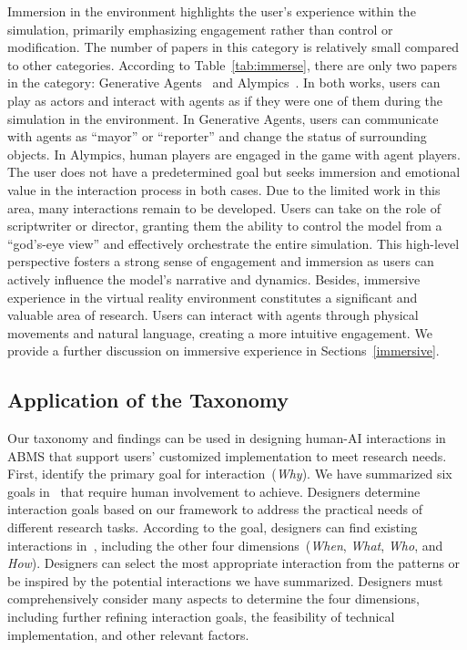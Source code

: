 Immersion in the environment highlights the user’s experience within the simulation, primarily emphasizing engagement rather than control or modification.
The number of papers in this category is relatively small compared to other categories.
According to Table~\ref{tab:immerse}, there are only two papers in the category: Generative Agents~\cite{10.1145/3586183.3606763} and Alympics~\cite{mao2024alympicsllmagentsmeet}.
In both works, users can play as actors and interact with agents as if they were one of them during the simulation in the environment.
In Generative Agents, users can communicate with agents as ``mayor'' or ``reporter'' and change the status of surrounding objects.
In Alympics, human players are engaged in the game with agent players.
The user does not have a predetermined goal but seeks immersion and emotional value in the interaction process in both cases.
Due to the limited work in this area, many interactions remain to be developed.
Users can take on the role of scriptwriter or director,  granting them the ability to control the model from a ``god’s-eye view'' and effectively orchestrate the entire simulation.
This high-level perspective fosters a strong sense of engagement and immersion as users can actively influence the model's narrative and dynamics.
Besides, immersive experience in the virtual reality environment constitutes a significant and valuable area of research.
Users can interact with agents through physical movements and natural language, creating a more intuitive engagement.
We provide a further discussion on immersive experience in Sections~\ref{immersive}.



\subsection{Application of the Taxonomy}
Our taxonomy and findings can be used in designing human-AI interactions in ABMS that support users' customized implementation to meet research needs.
First, identify the primary goal for interaction~(\textit{Why}). 
We have summarized six goals in~ that require human involvement to achieve.
Designers determine interaction goals based on our framework to address the practical needs of different research tasks.
According to the goal, designers can find existing interactions in~, including the other four dimensions~(\textit{When}, \textit{What}, \textit{Who}, and \textit{How}).
Designers can select the most appropriate interaction from the patterns or be inspired by the potential interactions we have summarized.
Designers must comprehensively consider many aspects to determine the four dimensions, including further refining interaction goals, the feasibility of technical implementation, and other relevant factors.